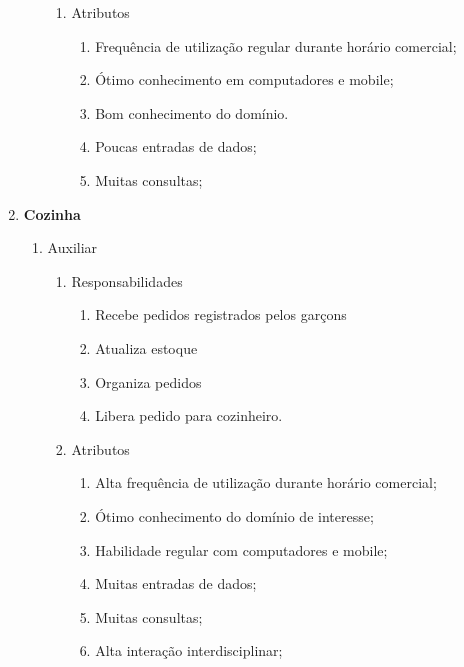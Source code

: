 \begin{enumerate}
\begin{enumerate}
\begin{enumerate}
        \item Atributos

          \begin{enumerate}

            \item Frequência de utilização regular durante horário comercial;
            \item Ótimo conhecimento em computadores e mobile;
            \item Bom conhecimento do domínio.
            \item Poucas entradas de dados;
            \item Muitas consultas;
          \end{enumerate}
      \end{enumerate}

    \end{enumerate}

\item \textbf{Cozinha}

    \begin{enumerate}

      \item Auxiliar

      \begin{enumerate}
        \item Responsabilidades

          \begin{enumerate}
            \item Recebe pedidos  registrados pelos garçons
            \item Atualiza estoque
            \item Organiza pedidos
            \item Libera pedido para cozinheiro.
          \end{enumerate}

        \item Atributos

          \begin{enumerate}
            \item Alta frequência de utilização durante horário comercial;
            \item Ótimo conhecimento do domínio de interesse;
            \item Habilidade regular com computadores e mobile;
            \item Muitas entradas de dados;
            \item Muitas consultas;
            \item Alta interação interdisciplinar;
          \end{enumerate}
      \end{enumerate}


\end{enumerate}
\end{enumerate}
